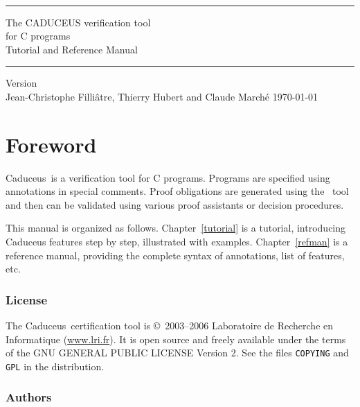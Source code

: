 \documentclass[12pt,a4paper,twoside,openright]{report}
\newcommand{\caduceus}{\textsf{Caduceus}}
\begin{document}
\sloppy

\thispagestyle{empty}
\begin{center}
~\\[3cm]
\rule\textwidth{0.1cm}\\[0.5cm]
{\Huge\sf The CADUCEUS verification tool \\[0.5em] for C programs}\\[1cm]
{\Large\sf Tutorial and Reference Manual}\\[0.1cm]
\rule\textwidth{0.1cm}\\[1cm]
Version \caduceusversion\\[3cm]
Jean-Christophe Filli\^atre, Thierry Hubert and Claude March\'e
\vfill
\today\\
\end{center}


\chapter*{Foreword}

\caduceus\ is a verification tool for C programs. Programs are
specified using annotations in special comments. Proof obligations are
generated using the \why\ tool~\cite{Why} and then can be validated using
various proof assistants or decision procedures.

\medskip

This manual is organized as follows. Chapter~\ref{tutorial} is a
tutorial, introducing \caduceus{} features step by step, illustrated
with examples. Chapter~\ref{refman} is a reference manual, providing
the complete syntax of annotations, list of features, etc.

\subsection*{License}

The \caduceus\ certification tool is \copyright\ 2003--2006 Laboratoire de
Recherche en Informatique (\url{www.lri.fr}).
It is open source and freely available under the terms of the GNU
GENERAL PUBLIC LICENSE Version 2. See the files \texttt{COPYING} and
\texttt{GPL} in the distribution.

\subsection*{Authors}
\end{document}
